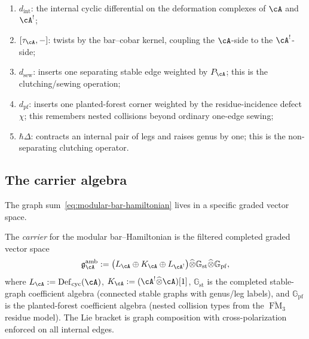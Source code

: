 \begin{remark}
\label{rem:five-pieces-meaning}
\begin{enumerate}[label=\textup{(\roman*)}]
\item $d_{\mathrm{int}}$: the internal cyclic differential on the
deformation complexes of $\cA$ and $\cA^!$;
\item $[\tau_{\cA},-]$: twists by the bar--cobar kernel, coupling
the $\cA$-side to the $\cA^!$-side;
\item $d_{\mathrm{sew}}$: inserts one separating stable edge
weighted by $P_{\cA}$; this is the clutching/sewing operation;
\item $d_{\mathrm{pf}}$: inserts one planted-forest corner weighted
by the residue-incidence defect $\chi$; this remembers nested
collisions beyond ordinary one-edge sewing;
\item $\hbar\Delta$: contracts an internal pair of legs and raises
genus by one; this is the non-separating clutching operator.
\end{enumerate}
\end{remark}

\subsection{The carrier algebra}
\label{subsec:carrier-algebra}

The graph sum~\eqref{eq:modular-bar-hamiltonian} lives in a specific
graded vector space.

\begin{definition}
\label{def:ambient-modular-complementarity-algebra}
The \emph{carrier} for the modular bar--Hamiltonian is the filtered
completed graded vector space
\begin{equation}
\label{eq:ambient-modular-complementarity-algebra}
\mathfrak{g}^{\mathrm{amb}}_{\cA}
:=
\bigl(L_{\cA} \oplus K_{\cA} \oplus L_{\cA^!}\bigr)
\widehat\otimes \mathbb{G}_{\mathrm{st}}
\widehat\otimes \mathbb{G}_{\mathrm{pf}},
\end{equation}
where $L_{\cA} := \operatorname{Def}_{\mathrm{cyc}}(\cA)$,
$K_{\cA} := (\cA^!\widehat\otimes\cA)[1]$,
$\mathbb{G}_{\mathrm{st}}$ is the completed stable-graph coefficient
algebra (connected stable graphs with genus/leg labels), and
$\mathbb{G}_{\mathrm{pf}}$ is the planted-forest coefficient algebra
(nested collision types from the $\overline{\operatorname{FM}}_3$
residue model).  The Lie bracket is graph composition with
cross-polarization enforced on all internal edges.
\end{definition}

